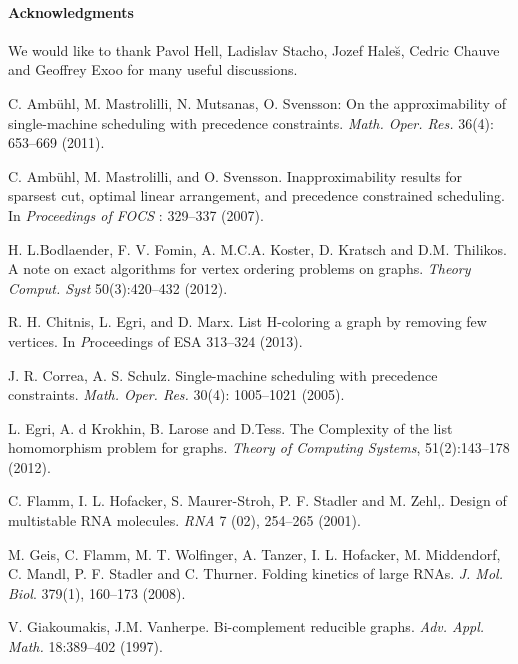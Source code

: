 \documentclass[letterpaper,11pt,abstracton]{scrartcl}
\begin{document}
\paragraph{\textbf Acknowledgments}
We would like to thank
Pavol Hell, Ladislav Stacho, Jozef Hale\u{s}, Cedric Chauve and Geoffrey Exoo for many useful
discussions.

\vspace{-3mm}

{\small \begin{thebibliography}{999}




 C. Amb\"uhl, M. Mastrolilli, N. Mutsanas, O. Svensson:
On the approximability of single-machine scheduling with precedence constraints. {\em Math. Oper. Res.} 36(4): 653--669 (2011).

 C. Amb\"uhl, M. Mastrolilli, and O. Svensson.
Inapproximability results for sparsest cut, optimal linear arrangement, and precedence constrained scheduling.
In {\em Proceedings of FOCS} : 329--337 (2007).

 H. L.Bodlaender, F. V. Fomin, A. M.C.A. Koster, D. Kratsch and
D.M. Thilikos. A note on exact algorithms for vertex ordering problems on graphs.
\emph{Theory Comput. Syst} 50(3):420--432 (2012).

 R. H. Chitnis, L. Egri, and D. Marx.
List H-coloring a graph by removing few vertices. In
{\emph Proceedings of ESA } 313--324 (2013).


 J. R. Correa, A. S. Schulz.
Single-machine scheduling with precedence constraints. {\em Math. Oper. Res.} 30(4):
1005--1021 (2005).

L. Egri, A. d Krokhin, B. Larose and D.Tess.
The Complexity of the list homomorphism problem for graphs.
\emph{Theory of Computing Systems}, 51(2):143--178 (2012).


C. Flamm, I. L. Hofacker, S. Maurer-Stroh, P. F. Stadler and M. Zehl,.
Design of multistable RNA molecules.
\emph{RNA} 7 (02), 254--265 (2001).



M. Geis, C. Flamm, M. T. Wolfinger, A. Tanzer, I. L. Hofacker, M. Middendorf, C. Mandl, P. F. Stadler and
C. Thurner.
Folding kinetics of large RNAs.
\emph{J. Mol. Biol}. 379(1), 160--173 (2008).

V. Giakoumakis, J.M. Vanherpe.
Bi-complement reducible graphs.
\emph{Adv. Appl. Math.} 18:389--402 (1997).


\end{thebibliography}}
\end{document}
